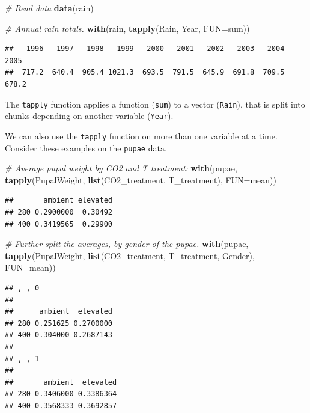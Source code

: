 \documentclass[]{book}
\newenvironment{Shaded}{\begin{snugshade}}{\end{snugshade}}
\newcommand{\CommentTok}[1]{\textcolor[rgb]{0.56,0.35,0.01}{\textit{#1}}}
\newcommand{\DataTypeTok}[1]{\textcolor[rgb]{0.13,0.29,0.53}{#1}}
\newcommand{\KeywordTok}[1]{\textcolor[rgb]{0.13,0.29,0.53}{\textbf{#1}}}
\newcommand{\NormalTok}[1]{#1}
\begin{document}
\begin{Shaded}
\begin{Highlighting}[]
\CommentTok{# Read data}
\KeywordTok{data}\NormalTok{(rain)}

\CommentTok{# Annual rain totals.}
\KeywordTok{with}\NormalTok{(rain, }\KeywordTok{tapply}\NormalTok{(Rain, Year, }\DataTypeTok{FUN=}\NormalTok{sum))}
\end{Highlighting}
\end{Shaded}

\begin{verbatim}
##   1996   1997   1998   1999   2000   2001   2002   2003   2004   2005 
##  717.2  640.4  905.4 1021.3  693.5  791.5  645.9  691.8  709.5  678.2
\end{verbatim}

The \texttt{tapply} function applies a function (\texttt{sum}) to a vector (\texttt{Rain}), that is split into chunks depending on another variable (\texttt{Year}).

We can also use the \texttt{tapply} function on more than one variable at a time. Consider these examples on the \texttt{pupae} data.

\begin{Shaded}
\begin{Highlighting}[]
\CommentTok{# Average pupal weight by CO2 and T treatment:}
\KeywordTok{with}\NormalTok{(pupae, }\KeywordTok{tapply}\NormalTok{(PupalWeight, }\KeywordTok{list}\NormalTok{(CO2_treatment, T_treatment), }\DataTypeTok{FUN=}\NormalTok{mean))}
\end{Highlighting}
\end{Shaded}

\begin{verbatim}
##       ambient elevated
## 280 0.2900000  0.30492
## 400 0.3419565  0.29900
\end{verbatim}

\begin{Shaded}
\begin{Highlighting}[]
\CommentTok{# Further split the averages, by gender of the pupae.}
\KeywordTok{with}\NormalTok{(pupae, }\KeywordTok{tapply}\NormalTok{(PupalWeight, }\KeywordTok{list}\NormalTok{(CO2_treatment, T_treatment, Gender), }\DataTypeTok{FUN=}\NormalTok{mean))}
\end{Highlighting}
\end{Shaded}

\begin{verbatim}
## , , 0
## 
##      ambient  elevated
## 280 0.251625 0.2700000
## 400 0.304000 0.2687143
## 
## , , 1
## 
##       ambient  elevated
## 280 0.3406000 0.3386364
## 400 0.3568333 0.3692857
\end{verbatim}
\end{document}
